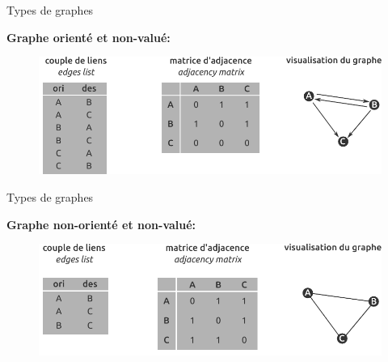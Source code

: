 \begin{frame}{Types de graphes}

\textbf{Graphe orienté et non-valué:}

\begin{figure}
  \includegraphics[width=12cm]{MatGraph2.pdf}
\end{figure}

\end{frame}


\begin{frame}{Types de graphes}

\textbf{Graphe non-orienté et non-valué:}

\begin{figure}
  \includegraphics[width=12cm]{MatGraph3.pdf}
\end{figure}

\end{frame}



